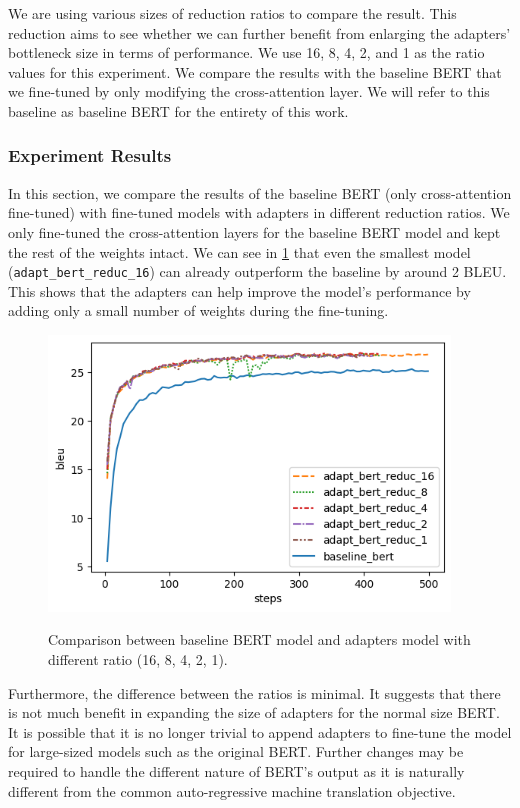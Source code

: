 We are using various sizes of reduction ratios to compare the result. This reduction aims to see whether we can further benefit from enlarging the adapters' bottleneck size in terms of performance. We use 16, 8, 4, 2, and 1 as the ratio values for this experiment. We compare the results with the baseline BERT that we fine-tuned by only modifying the cross-attention layer. We will refer to this baseline as baseline BERT for the entirety of this work.

\subsubsection{Experiment Results}
In this section, we compare the results of the baseline BERT (only cross-attention fine-tuned) with fine-tuned models with adapters in different reduction ratios. We only fine-tuned the cross-attention layers for the baseline BERT model and kept the rest of the weights intact. We can see in \cref{img:adapt_bert_ratio} that even the smallest model (\texttt{adapt\_bert\_reduc\_16}) can already outperform the baseline by around 2 BLEU. This shows that the adapters can help improve the model's performance by adding only a small number of weights during the fine-tuning.

\begin{figure}[]
    {\includegraphics[width=0.95\textwidth]{img/adapter_bert_baseline_adapters.png}}
    \centering
    \caption{Comparison between baseline BERT model and adapters model with different ratio (16, 8, 4, 2, 1).}
    \label{img:adapt_bert_ratio}
\end{figure}

Furthermore, the difference between the ratios is minimal. It suggests that there is not much benefit in expanding the size of adapters for the normal size BERT. It is possible that it is no longer trivial to append adapters to fine-tune the model for large-sized models such as the original BERT. Further changes may be required to handle the different nature of BERT's output as it is naturally different from the common auto-regressive machine translation objective.


